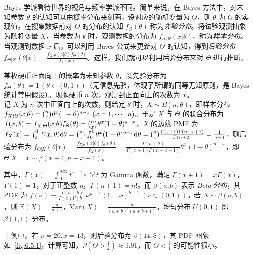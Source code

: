 \documentclass[../main.tex]{subfiles}
\begin{document}
Bayes 学派看待世界的视角与频率学派不同。简单来说，在 Bayes 方法中，对未知参数 $\theta$ 的认知可以由概率分布来刻画，设对应的随机变量为 $\Theta$，则 $\theta$ 为 $\Theta$ 的实现值。在搜集数据前对 $\Theta$ 的分布的认知 $f_\Theta(\theta)$ 称为\emph{先验分布}。将试验观测抽象为随机变量 $X$，当参数为 $\theta$ 时，观测数据的分布为 $f_{X|\Theta}(x|\theta)$，称为\emph{样本分布}。当观测到数据 $x$ 后，可以利用 Bayes 公式来更新对 $\Theta$ 的认知，得到\emph{后验分布} $f_{\Theta|X}(\theta|x)=\frac{f_{X|\Theta}(x|\theta)f_\Theta(\theta)}{f_X(x)}$。这样，我们就可以利用后验分布来对 $\Theta$ 进行推断。

\begin{example}
    某枚硬币正面向上的概率为未知参数 $\theta$，设先验分布为 $f_\Theta(\theta)=1\ (\theta\in(0,1))$（无信息先验，体现了所谓的同等无知原则，是 Bayes 统计常用假设）。现抛硬币 $n$ 次，观测到正面向上的次数为 $x$。\\
    记 $X$ 为 $n$ 次中正面向上的次数，则给定 $\theta$ 时，$X\sim B(n,\theta)$，即样本分布 $f_{X|\Theta}(x|\theta)=\tbinom nx\theta^x(1-\theta)^{n-x}\ (x=1,\cdots,n)$。于是 $X$ 与 $\Theta$ 的联合分布为 $f(x,\theta)=f_{X|\Theta}(x|\theta)f_\Theta(\theta)=\tbinom nx\theta^x(1-\theta)^{n-x}$，$X$ 的边缘 PMF 为 $f_X(x)=\int_0^1f(x,\theta)\mathrm d\theta=\tbinom nx\int_0^1\theta^x(1-\theta)^{n-x}\mathrm d\theta=\tbinom nx\frac{\Gamma(x+1)\Gamma(n-x+1)}{\Gamma(n+2)}=\frac1{n+1}$，则后验分布为 $f_{\Theta|X}(\theta|x)=\frac{f_{X|\Theta}(x|\theta)f_\Theta(\theta)}{f_X(x)}=\frac{\Gamma(n+2)}{\Gamma(x+1)\Gamma(n-x+1)}\theta^x(1-\theta)^{n-x}$，即 $\Theta|X=x\sim\beta(x+1,n-x+1)$。
\end{example}

其中，$\Gamma(x)=\int_0^{+\infty} t^{x-1}e^{-t}\mathrm dt$ 为 Gamma 函数，满足 $\Gamma(x+1)=x\Gamma(x)$，$\Gamma(1)=1$，对于正整数 $n$，$\Gamma(n+1)=n!$。而 $\beta(a,b)$ 表示 \emph{Beta 分布}，其 PDF 为 $f(x)=\frac{\Gamma(a+b)}{\Gamma(a)\Gamma(b)}x^{a-1}(1-x)^{b-1}\ (x\in(0,1))$。若 $X\sim\beta(a,b)$，则 $\mathrm E(X)=\frac a{a+b}$，$\mathrm{Var}(X)=\frac{ab}{(a+b)^2(a+b+1)}$。均匀分布 $U(0,1)$ 即 $\beta(1,1)$ 分布。

上例中，若 $n=20,x=13$，则后验分布为 $\beta(14,8)$，其 PDF 图象如~\ref{fig:6.5.1}。计算可知，$P(\Theta>\frac12)\approx0.91$，而 $\Theta<\frac14$ 的可能性很小。
\end{document}
